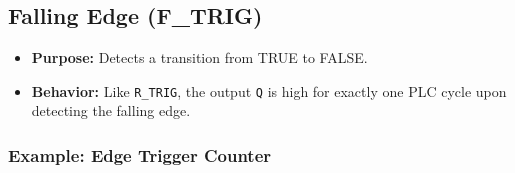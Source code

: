 \documentclass[11pt,a4paper]{article}
\begin{document}
\subsection{Falling Edge (F\_TRIG)}

\begin{itemize}[leftmargin=*]
    \item \textbf{Purpose:} Detects a transition from TRUE to FALSE.
    \item \textbf{Behavior:} Like \texttt{R\_TRIG}, the output \texttt{Q} is high for exactly one PLC cycle upon detecting the falling edge.
\end{itemize}

\subsubsection*{Example: Edge Trigger Counter}
\end{document}
